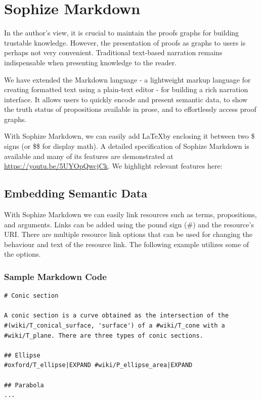 \documentclass[runningheads]{llncs}
\begin{document}
\section{Sophize Markdown}

In the author's view, it is crucial to maintain the proofs graphs for building trustable knowledge. However, the presentation of proofs as graphs to users is perhaps not very convenient. Traditional text-based narration remains indispensable when presenting knowledge to the reader.

We have extended the Markdown language - a lightweight markup language for creating formatted text using a plain-text editor - for building a rich narration interface. It allows users to quickly encode and present semantic data, to show the truth status of propositions available in prose, and to effortlessly access proof graphs. 

With Sophize Markdown, we can easily add \LaTeX\space by enclosing it between two \$ signs (or \$\$ for display math). A detailed specification of Sophize Markdown is available \cite{EasyChair6207} and many of its features are demonstrated at \url{https://youtu.be/5UYOpQwcjCk}. We highlight relevant features here:

\subsection{Embedding Semantic Data}

With Sophize Markdown we can easily link resources such as terms, propositions, and arguments. Links can be added using the pound sign (\#) and the resource's URI. There are multiple resource link options that can be used for changing the behaviour and text of the resource link. The following example utilizes some of the options.

\subsubsection*{Sample Markdown Code}

\begin{verbatim}
# Conic section

A conic section is a curve obtained as the intersection of the 
#(wiki/T_conical_surface, 'surface') of a #wiki/T_cone with a 
#wiki/T_plane. There are three types of conic sections.

## Ellipse
#oxford/T_ellipse|EXPAND #wiki/P_ellipse_area|EXPAND

## Parabola
...
\end{verbatim}
\end{document}
